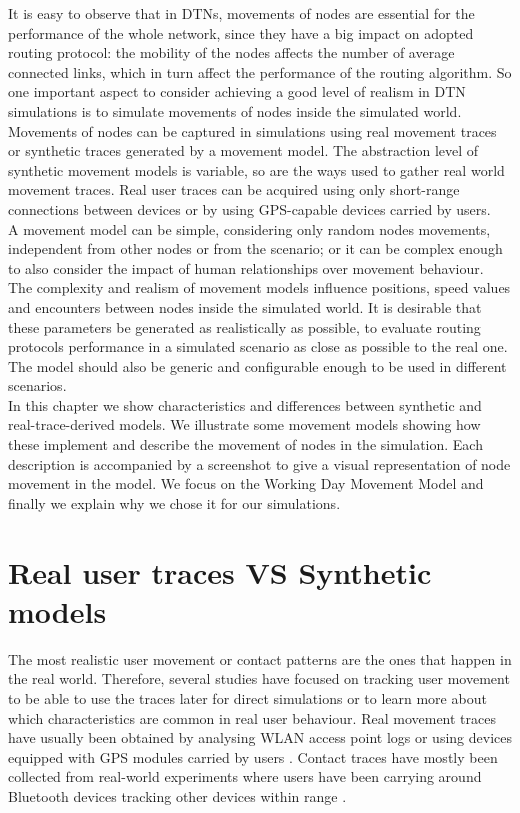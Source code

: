 It is easy to observe that in DTNs, movements of nodes are essential for the performance of the whole network, since they have a big impact on adopted routing protocol: the mobility of the nodes affects the number of average connected links, which in turn affect the performance of the routing algorithm.
So one important aspect to consider achieving a good level of realism in DTN simulations is to simulate movements of nodes inside the simulated world. 
\\

Movements of nodes can be captured in simulations using real movement traces or synthetic traces generated by a movement model. The abstraction level of synthetic movement models is variable, so are the ways used to gather real world movement traces. Real user traces can be acquired using only short-range connections between devices or by using GPS-capable devices carried by users.
\\

A movement model can be simple, considering only random nodes movements, independent from other nodes or from the scenario; or it can be complex enough to also consider the impact of human relationships over movement behaviour. The complexity and realism of movement models influence positions, speed values and encounters between nodes inside the simulated world. It is desirable that these parameters be generated as realistically as possible, to evaluate routing protocols performance in a simulated scenario as close as possible to the real one. The model should also be generic and configurable enough to be used in different scenarios.
\\

In this chapter we show characteristics and differences between synthetic and real-trace-derived models. We illustrate some movement models showing how these implement and describe the movement of nodes in the simulation. Each description is accompanied by a screenshot to give a visual representation of node movement in the model. We focus on the Working Day Movement Model and finally we explain why we chose it for our simulations.

\section{Real user traces VS Synthetic models}
The most realistic user movement or contact patterns are the ones that happen in the real world. Therefore, several studies have focused on tracking user movement to be able to use the traces later for direct simulations or to learn more about which characteristics are common in real user behaviour. Real movement traces have usually been obtained by analysing WLAN access point logs \cite{Balachandran:2002:CUB:511399.511359} \cite{Ghosh:2006:PMP:1132983.1132993} \cite{Shaffer:2005:AMM:1104998.1105285} or using devices equipped with GPS modules carried by users \cite{Ashbrook:2002:LSL:862896.881068}. Contact traces have mostly been collected from real-world experiments where users have been carrying around Bluetooth devices tracking other devices within range \cite{Natarajan:2007:UUI:1762888.1762904}.
\\

